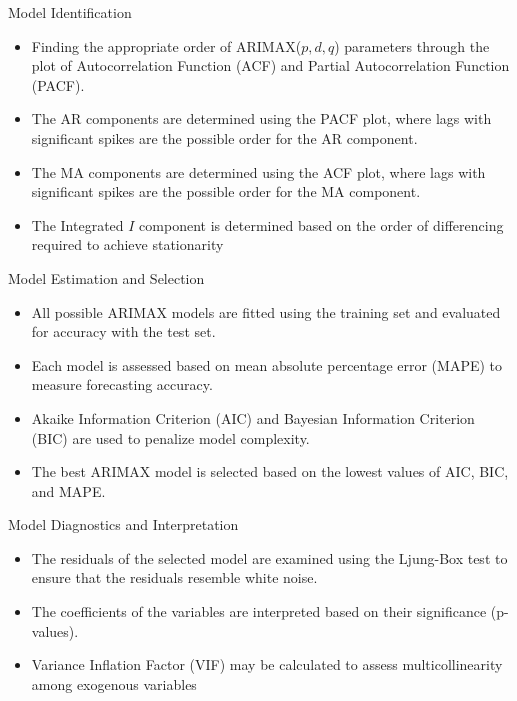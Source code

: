 \documentclass[12pt, aspectratio=169]{beamer}
\begin{document}
\begin{frame}{Model Identification}
    \begin{itemize}
        \item Finding the appropriate order of ARIMAX($p,d,q$) parameters through the plot of Autocorrelation Function (ACF) and Partial Autocorrelation Function (PACF).
        \item The AR components are determined using the PACF plot, where lags with significant spikes are the possible order for the AR component.
        \item The MA components are determined using the ACF plot, where lags with significant spikes are the possible order for the MA component.
        \item The Integrated $I$ component is determined based on the order of differencing required to achieve stationarity
    \end{itemize}
\end{frame}

\begin{frame}{Model Estimation and Selection}
    \begin{itemize}
        \item All possible ARIMAX models are fitted using the training set and evaluated for accuracy with the test set.
        \item Each model is assessed based on mean absolute percentage error (MAPE) to measure forecasting accuracy. 
        \item Akaike Information Criterion (AIC) and Bayesian Information Criterion (BIC) are used to penalize model complexity.
        \item The best ARIMAX model is selected based on the lowest values of AIC, BIC, and MAPE.
    \end{itemize}
\end{frame}

\begin{frame}{Model Diagnostics and Interpretation}
    \begin{itemize}
        \item The residuals of the selected model are examined using the Ljung-Box test to ensure that the residuals resemble white noise.
        \item The coefficients of the variables are interpreted based on their significance (p-values).
        \item Variance Inflation Factor (VIF) may be calculated to assess multicollinearity among exogenous variables
    \end{itemize}
\end{frame}
\end{document}
